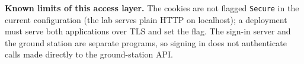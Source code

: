 \textbf{Known limits of this access layer.} The cookies are not flagged \texttt{Secure} in the current configuration (the lab serves plain HTTP on localhost); a deployment must serve both applications over TLS and set the flag. The sign-in server and the ground station are separate programs, so signing in does not authenticate calls made directly to the ground-station API.
